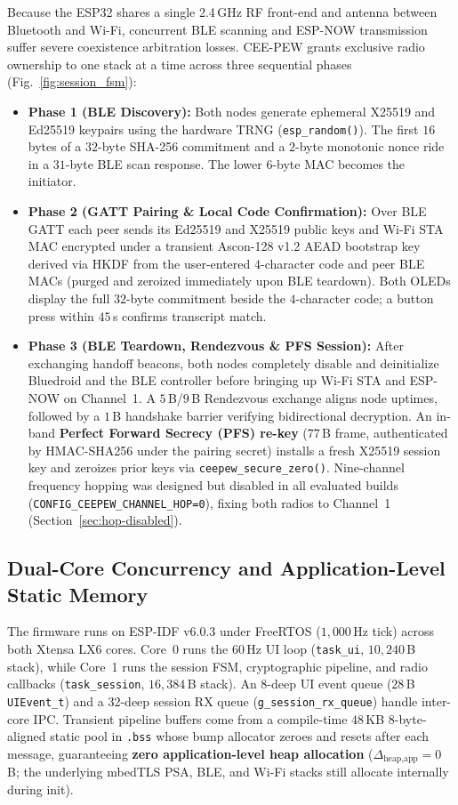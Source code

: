 \documentclass[conference]{IEEEtran}
\begin{document}
Because the ESP32 shares a single 2.4\,GHz RF front-end and antenna between Bluetooth and Wi-Fi, concurrent BLE scanning and ESP-NOW transmission suffer severe coexistence arbitration losses. CEE-PEW grants exclusive radio ownership to one stack at a time across three sequential phases (Fig.~\ref{fig:session_fsm}):
\begin{itemize}
\setlength{\itemsep}{0pt}\setlength{\parskip}{0pt}
\item \textbf{Phase 1 (BLE Discovery):} Both nodes generate ephemeral X25519 and Ed25519 keypairs using the hardware TRNG (\texttt{esp\_random()}). The first $16$ bytes of a $32$-byte SHA-256 commitment and a $2$-byte monotonic nonce ride in a $31$-byte BLE scan response. The lower 6-byte MAC becomes the initiator.
\item \textbf{Phase 2 (GATT Pairing \& Local Code Confirmation):} Over BLE GATT each peer sends its Ed25519 and X25519 public keys and Wi-Fi STA MAC encrypted under a transient Ascon-128 v1.2 AEAD bootstrap key derived via HKDF from the user-entered $4$-character code and peer BLE MACs (purged and zeroized immediately upon BLE teardown). Both OLEDs display the full $32$-byte commitment beside the $4$-character code; a button press within $45$\,s confirms transcript match.
\item \textbf{Phase 3 (BLE Teardown, Rendezvous \& PFS Session):} After exchanging handoff beacons, both nodes completely disable and deinitialize Bluedroid and the BLE controller before bringing up Wi-Fi STA and ESP-NOW on Channel~1. A $5$\,B/$9$\,B Rendezvous exchange aligns node uptimes, followed by a $1$\,B handshake barrier verifying bidirectional decryption. An in-band \textbf{Perfect Forward Secrecy (PFS) re-key} ($77$\,B frame, authenticated by HMAC-SHA256 under the pairing secret) installs a fresh X25519 session key and zeroizes prior keys via \texttt{ceepew\_secure\_zero()}. Nine-channel frequency hopping was designed but disabled in all evaluated builds (\texttt{CONFIG\_CEEPEW\_CHANNEL\_HOP=0}), fixing both radios to Channel~1 (Section~\ref{sec:hop-disabled}).
\end{itemize}

\subsection{Dual-Core Concurrency and Application-Level Static Memory}
The firmware runs on ESP-IDF v6.0.3 under FreeRTOS ($1{,}000$\,Hz tick) across both Xtensa LX6 cores. Core~0 runs the $60$\,Hz UI loop (\texttt{task\_ui}, $10{,}240$\,B stack), while Core~1 runs the session FSM, cryptographic pipeline, and radio callbacks (\texttt{task\_session}, $16{,}384$\,B stack). An 8-deep UI event queue ($28$\,B \texttt{UIEvent\_t}) and a 32-deep session RX queue (\texttt{g\_session\_rx\_queue}) handle inter-core IPC. Transient pipeline buffers come from a compile-time $48$\,KB 8-byte-aligned static pool in \texttt{.bss} whose bump allocator zeroes and resets after each message, guaranteeing \textbf{zero application-level heap allocation} ($\Delta_{\text{heap,app}} = 0$\,B; the underlying mbedTLS PSA, BLE, and Wi-Fi stacks still allocate internally during init).
\end{document}
